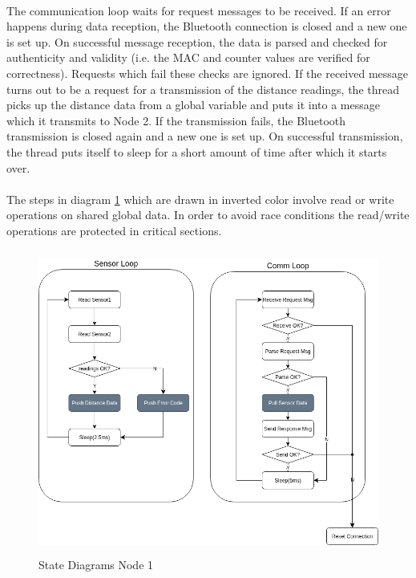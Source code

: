\paragraph{}
The communication loop waits for request messages to be received. If an error happens during data reception, the Bluetooth connection is closed and a new one is set up. On successful message reception, the data is parsed and checked for authenticity and validity (i.e. the MAC and counter values are verified for correctness). Requests which fail these checks are ignored. If the received message turns out to be a request for a transmission of the distance readings, the thread picks up the distance data from a global variable and puts it into a message which it transmits to Node 2. If the transmission fails, the Bluetooth transmission is closed again and a new one is set up. On successful transmission, the thread puts itself to sleep for a short amount of time after which it starts over.

\paragraph{}
The steps in diagram \ref{fig:stateDiagramNode1} which are drawn in inverted color involve read or write operations on shared global data. In order to avoid race conditions the read/write operations are protected in critical sections.

\begin{figure}[h]
	\includegraphics[height=100mm]{images/StateDiagramNode1.png}
	\centering
	\caption{State Diagrams Node 1}
	\label{fig:stateDiagramNode1}
\end{figure}

